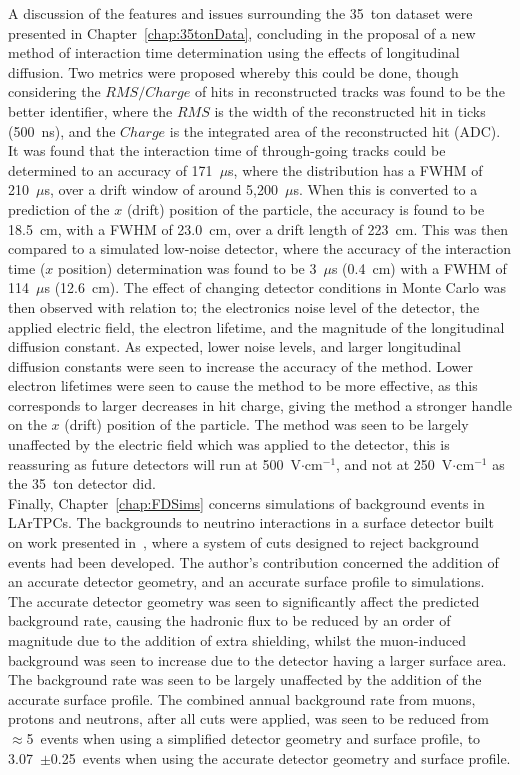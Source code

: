 A discussion of the features and issues surrounding the 35~ton dataset were presented in Chapter~\ref{chap:35tonData}, concluding in the proposal of a new method of interaction time determination using the effects of longitudinal diffusion. Two metrics were proposed whereby this could be done, though considering the $RMS/Charge$ of hits in reconstructed tracks was found to be the better identifier, where the $RMS$ is the width of the reconstructed hit in ticks (500~ns), and the $Charge$ is the integrated area of the reconstructed hit (ADC). It was found that the interaction time of through-going tracks could be determined to an accuracy of 171~$\mu$s, where the distribution has a FWHM of 210~$\mu$s, over a drift window of around 5,200~$\mu$s. When this is converted to a prediction of the $x$ (drift) position of the particle, the accuracy is found to be 18.5~cm, with a FWHM of 23.0~cm, over a drift length of 223~cm. This was then compared to a simulated low-noise detector, where the accuracy of the interaction time ($x$ position) determination was found to be 3~$\mu$s (0.4~cm) with a FWHM of 114~$\mu$s (12.6~cm). The effect of changing detector conditions in Monte Carlo was then observed with relation to; the electronics noise level of the detector, the applied electric field, the electron lifetime, and the magnitude of the longitudinal diffusion constant. As expected, lower noise levels, and larger longitudinal diffusion constants were seen to increase the accuracy of the method. Lower electron lifetimes were seen to cause the method to be more effective, as this corresponds to larger decreases in hit charge, giving the method a stronger handle on the $x$ (drift) position of the particle. The method was seen to be largely unaffected by the electric field which was applied to the detector, this is reassuring as future detectors will run at 500~V$\cdot$cm$^{-1}$, and not at 250~V$\cdot$cm$^{-1}$ as the 35~ton detector did. \\

Finally, Chapter~\ref{chap:FDSims} concerns simulations of background events in LArTPCs. The backgrounds to neutrino interactions in a surface detector built on work presented in~\citep{MartinsThesis}, where a system of cuts designed to reject background events had been developed. The author's contribution concerned the addition of an accurate detector geometry, and an accurate surface profile to simulations. The accurate detector geometry was seen to significantly affect the predicted background rate, causing the hadronic flux to be reduced by an order of magnitude due to the addition of extra shielding, whilst the muon-induced background was seen to increase due to the detector having a larger surface area. The background rate was seen to be largely unaffected by the addition of the accurate surface profile. The combined annual background rate from muons, protons and neutrons, after all cuts were applied, was seen to be reduced from $\approx$5~events when using a simplified detector geometry and surface profile, to 3.07~$\pm$0.25~events when using the accurate detector geometry and surface profile. \\

